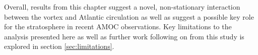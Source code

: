 Overall, results from this chapter suggest a novel, non-stationary interaction between the vortex and Atlantic circulation as well as suggest a possible key role for the stratosphere in recent AMOC observations. Key limitations to the analysis presented here as well as further work following on from this study is explored in section \ref{sec:limitations}.






